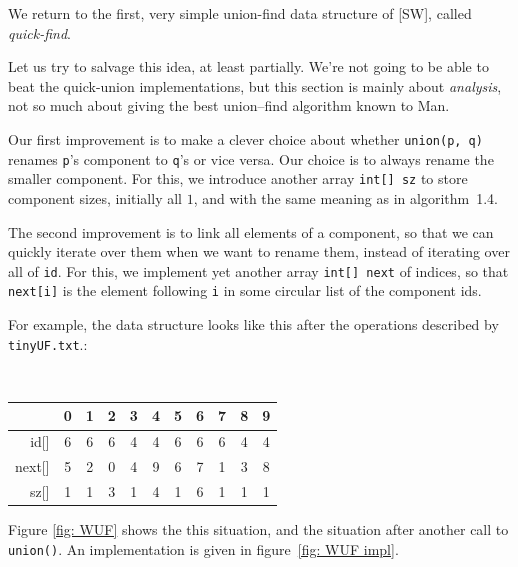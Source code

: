 \documentclass{tufte-handout}
\begin{document}
\bigskip
We return to the first, very simple union-find data structure of [SW],
called \emph{quick-find}. 

Let us try to salvage this idea, at least partially. We're not going
to be able to beat the quick-union implementations, but this section
is mainly about \emph{analysis}, not so much about giving the best
union--find algorithm known to Man.

Our first improvement is to make a clever choice about whether
\texttt{union(p, q)} renames {\tt p}'s component to {\tt q}'s or vice
versa. 
Our choice is to always rename the smaller component.
For this, we introduce another array {\tt int[] sz} to store component
sizes, initially all $1$, and with the same meaning as in
algorithm~1.4.

The second improvement is to link all elements of a component, so that
we can quickly iterate over them when we want to rename them, instead
of iterating over all of {\tt id}.
For this, we implement yet another array {\tt int[] next} of indices,
so that {\tt next[i]} is the element following {\tt i} in some
circular list of the component ids.

For example, the data structure looks like this after the operations
described by {\tt tinyUF.txt}.:

\medskip
{\tt \small
  \begin{tabular}{rcccccccccc}
      & 0 & 1 & 2 & 3 & 4 & 5 & 6 & 7 & 8 & 9 \\\midrule
id[] & 6 &6 &6 &4 &4 &6 &6 &6 &4 &4 \\
next[] & 5 &2 &0 &4 &9 &6 &7 &1 &3 &8 \\
sz[] &1 &1 &3 &1 &4 &1 &6 &1 &1 &1 
  \end{tabular}}
\medskip

Figure \ref{fig: WUF} shows the this situation, and the situation
after another call to {\tt union()}. 
An implementation is given in figure~\ref{fig: WUF impl}.
\end{document}
